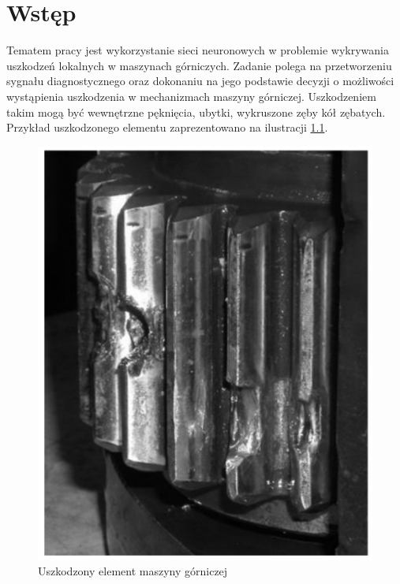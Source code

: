 \documentclass[inzynierska]{pwr_wmat_praca_dyplomowa}
\theoremstyle{plain}
\numberwithin{theorem}{chapter}
\theoremstyle{definition}
\numberwithin{theorem}{chapter}
\begin{document}
\frontmatter
\maketitle
\mainmatter
\tableofcontents



{\backmatter \chapter{Wstęp}}

Tematem pracy jest wykorzystanie sieci neuronowych w problemie wykrywania uszkodzeń lokalnych w maszynach górniczych. Zadanie polega na przetworzeniu sygnału diagnostycznego oraz dokonaniu na jego podstawie decyzji o możliwości wystąpienia uszkodzenia w mechanizmach maszyny górniczej. Uszkodzeniem takim mogą być\cite{einstein} wewnętrzne pęknięcia, ubytki, wykruszone zęby kół zębatych. Przykład uszkodzonego elementu zaprezentowano na ilustracji \ref{uszkodzenie}.
\begin{figure}[ht]
	
	\centering
	
	\includegraphics[scale=0.5]{images/uszkodzenie_kolko.png}
	\caption{Uszkodzony element maszyny górniczej}
	\label{uszkodzenie}
\end{figure}
\end{document}
